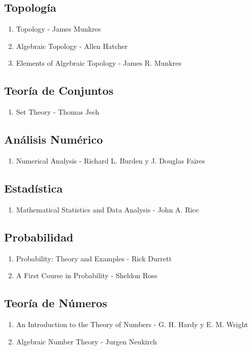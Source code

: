 \documentclass{article}
\begin{document}
\subsection{Topolog\'ia}
\begin{enumerate}
	\item Topology - James Munkres
	\item Algebraic Topology - Allen Hatcher
	\item Elements of Algebraic Topology - James R. Munkres
\end{enumerate}
\subsection{Teor\'ia de Conjuntos}
\begin{enumerate}
	\item Set Theory - Thomas Jech
\end{enumerate}
\subsection{An\'alisis Num\'erico}
\begin{enumerate}
	\item Numerical Analysis - Richard L. Burden y J. Douglas Faires
\end{enumerate}
\subsection{Estad\'istica}
\begin{enumerate}
	\item Mathematical Statistics and Data Analysis - John A. Rice
\end{enumerate}
\subsection{Probabilidad}
\begin{enumerate}
	\item Probability: Theory and Examples - Rick Durrett
	\item A First Course in Probability - Sheldon Ross
\end{enumerate}
\subsection{Teor\'ia de N\'umeros}
\begin{enumerate}
	\item An Introduction to the Theory of Numbers - G. H. Hardy y E. M. Wright
	\item Algebraic Number Theory - J\:urgen Neukirch
\end{enumerate}
\end{document}
